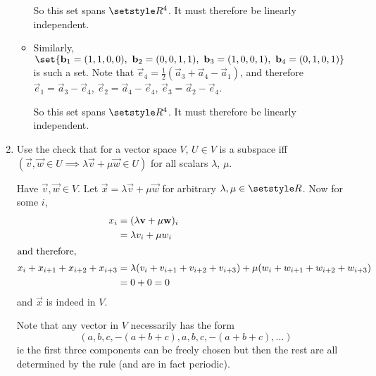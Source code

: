 \documentclass[fleqn,a4paper,11pt]{article}
\begin{document}
\begin{enumerate}[label=\textbf{\arabic*.}]
\begin{itemize}
      So this set spans \(\Reals^4\). It must therefore be linearly independent.
     \item
      Similarly,
      \(\set{\vec b_1 = (1, 1, 0, 0),\ \vec b_2 = (0, 0, 1, 1),
           \ \vec b_3 = (1, 0, 0, 1),\ \vec b_4 = (0, 1, 0, 1)}\)
      is such a set. Note that
      \(\vec e_4 = \frac 12 (\vec a_3 + \vec a_4 - \vec a_1)\), and therefore
      \(\vec e_1 = \vec a_3 - \vec e_4\),
      \(\vec e_2 = \vec a_4 - \vec e_4\),
      \(\vec e_3 = \vec a_2 - \vec e_4\).

      So this set spans \(\Reals^4\). It must therefore be linearly independent.
    \end{itemize}
   \item
    Use the check that for a vector space \(V\), \(U \in V\) is a subspace iff
    \\ \((\vec v, \vec w \in U \implies \lambda \vec v + \mu \vec w \in U)\) for
    all scalars \(\lambda\), \(\mu\).

    Have \(\vec v, \vec w \in V\). Let \(\vec x = \lambda \vec v + \mu \vec w\)
    for arbitrary \(\lambda, \mu \in \Reals\). Now for some \(i\),
    \begin{align*}
     x_i &= (\lambda \vec v + \mu \vec w)_i \\
         &= \lambda v_i + \mu w_i \\
     \intertext{and therefore,}
     x_i + x_{i + 1} + x_{i + 2} + x_{i + 3} &=
      \lambda(v_i + v_{i + 1} + v_{i + 2} + v_{i + 3}) +
      \mu(w_i + w_{i + 1} + w_{i + 2} + w_{i + 3}) \\
      &= 0 + 0 = 0
    \end{align*}
    and \(\vec x\) is indeed in \(V\).

    Note that any vector in \(V\) necessarily has the form
    \begin{equation*}
     (a, b, c, -(a + b + c), a, b, c, -(a + b + c), \dotsc)
    \end{equation*}
    ie the first three components can be freely chosen but then the rest are all
    determined by the rule (and are in fact periodic).


\end{enumerate}
\end{document}
